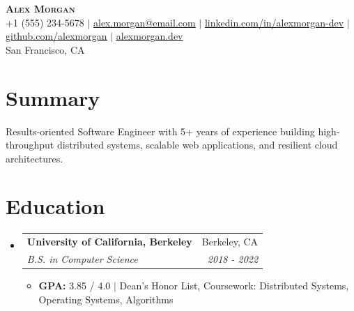 \documentclass[letterpaper,10.8pt]{article}
\makeatletter
\newcommand{\resumeItem}[1]{
  \item\small{
    {#1 \vspace{-2pt}}
  }
}
\newcommand{\resumeSubheading}[4]{
  \vspace{-1pt}\item
    \begin{tabular*}{0.98\textwidth}[t]{l@{\extracolsep{\fill}}r}
      \textbf{#1} & #2 \\
      \textit{\small#3} & \textit{\small #4} \\
    \end{tabular*}\vspace{-6pt}
}
\newcommand{\resumeSubHeadingListStart}{\begin{itemize}[leftmargin=0.15in, label={}]}
\newcommand{\resumeSubHeadingListEnd}{\end{itemize}}
\newcommand{\resumeItemListStart}{\begin{itemize}[leftmargin=0.15in]}
\newcommand{\resumeItemListEnd}{\end{itemize}\vspace{-4pt}}
\makeatother
\begin{document}
\begin{center}
    \textbf{\Huge \scshape Alex Morgan} \\ \vspace{2pt}
    \small +1 (555) 234-5678 $|$ \href{mailto:alex.morgan@email.com}{\underline{alex.morgan@email.com}} $|$ 
    \href{https://linkedin.com/in/alexmorgan-dev}{\underline{linkedin.com/in/alexmorgan-dev}} $|$
    \href{https://github.com/alexmorgan}{\underline{github.com/alexmorgan}} 
    $|$ \href{https://alexmorgan.dev}{\underline{alexmorgan.dev}}
    \\ \vspace{1pt}
    \small San Francisco, CA
\end{center}

\section{Summary}
  \small{Results-oriented Software Engineer with 5+ years of experience building high-throughput distributed systems, scalable web applications, and resilient cloud architectures.}


\section{Education}
  \resumeSubHeadingListStart
    \resumeSubheading
      {University of California, Berkeley}{Berkeley, CA}
      {B.S. in Computer Science}{2018 - 2022}
    \resumeItemListStart
      \resumeItem{\textbf{GPA:} 3.85 / 4.0 $|$ Dean's Honor List, Coursework: Distributed Systems, Operating Systems, Algorithms}
    \resumeItemListEnd
  \resumeSubHeadingListEnd

\end{document}
